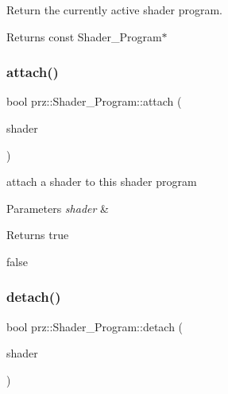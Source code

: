 Return the currently active shader program. 

\begin{DoxyReturn}{Returns}
const Shader\+\_\+\+Program$\ast$ 
\end{DoxyReturn}
\mbox{\label{classprz_1_1_shader___program_abdd9abf63919d1c550bae23e0bdc76a5}} 
\subsubsection{\texorpdfstring{attach()}{attach()}}
{\footnotesize\ttfamily bool prz\+::\+Shader\+\_\+\+Program\+::attach (\begin{DoxyParamCaption}\item[{P\+S\+Ptr$<$ \mbox{\hyperlink{classprz_1_1_shader}{Shader}} $>$}]{shader }\end{DoxyParamCaption})\hspace{0.3cm}{\ttfamily [inline]}}



attach a shader to this shader program 


\begin{DoxyParams}{Parameters}
{\em shader} & \\
\hline
\end{DoxyParams}
\begin{DoxyReturn}{Returns}
true 

false 
\end{DoxyReturn}
\mbox{\label{classprz_1_1_shader___program_ac0a5e9ee801dc29757beb391fb9ee9ca}} 
\subsubsection{\texorpdfstring{detach()}{detach()}}
{\footnotesize\ttfamily bool prz\+::\+Shader\+\_\+\+Program\+::detach (\begin{DoxyParamCaption}\item[{P\+S\+Ptr$<$ \mbox{\hyperlink{classprz_1_1_shader}{Shader}} $>$}]{shader }\end{DoxyParamCaption})\hspace{0.3cm}{\ttfamily [inline]}}



